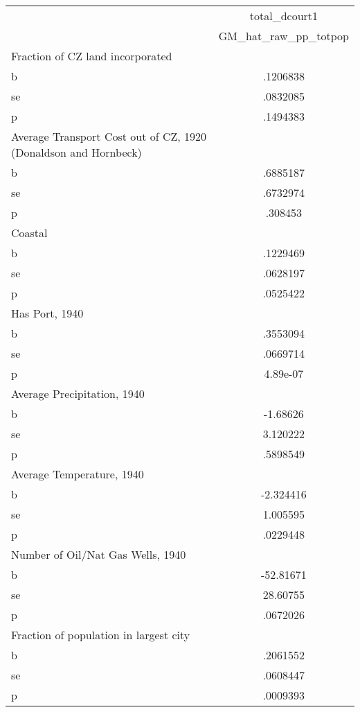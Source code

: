 \begin{tabular}{l*{1}{c}}
\toprule
                &total\_dcourt1\\
                &GM\_hat\_raw\_pp\_totpop\\
\midrule
Fraction of CZ land incorporated&         \\
b               & .1206838\\
se              & .0832085\\
p               & .1494383\\
\midrule
Average Transport Cost out of CZ, 1920 (Donaldson and Hornbeck)&         \\
b               & .6885187\\
se              & .6732974\\
p               &  .308453\\
\midrule
Coastal         &         \\
b               & .1229469\\
se              & .0628197\\
p               & .0525422\\
\midrule
Has Port, 1940  &         \\
b               & .3553094\\
se              & .0669714\\
p               & 4.89e-07\\
\midrule
Average Precipitation, 1940&         \\
b               & -1.68626\\
se              & 3.120222\\
p               & .5898549\\
\midrule
Average Temperature, 1940&         \\
b               &-2.324416\\
se              & 1.005595\\
p               & .0229448\\
\midrule
Number of Oil/Nat Gas Wells, 1940&         \\
b               &-52.81671\\
se              & 28.60755\\
p               & .0672026\\
\midrule
Fraction of population in largest city&         \\
b               & .2061552\\
se              & .0608447\\
p               & .0009393\\

\end{tabular}
